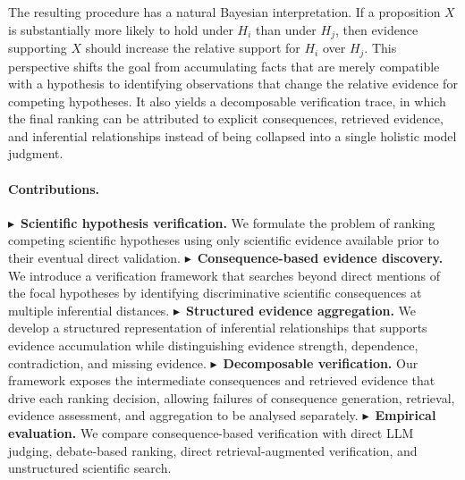\documentclass[twoside]{article}
\begin{document}
The resulting procedure has a natural Bayesian interpretation. If a
proposition $X$ is substantially more likely to hold under $H_i$ than under
$H_j$, then evidence supporting $X$ should increase the relative support for
$H_i$ over $H_j$. This perspective shifts the goal from accumulating facts that are merely
compatible with a hypothesis to identifying observations that change the
relative evidence for competing hypotheses. It also yields a decomposable
verification trace, in which the final ranking can be attributed to explicit
consequences, retrieved evidence, and inferential relationships instead of
being collapsed into a single holistic model judgment.

\paragraph{Contributions.}
$\blacktriangleright$~\textbf{Scientific hypothesis verification.}
We formulate the problem of ranking competing scientific hypotheses using only
scientific evidence available prior to their eventual direct validation.
$\blacktriangleright$~\textbf{Consequence-based evidence discovery.}
We introduce a verification framework that searches beyond direct mentions of
the focal hypotheses by identifying discriminative scientific consequences at
multiple inferential distances.
$\blacktriangleright$~\textbf{Structured evidence aggregation.}
We develop a structured representation of inferential relationships that
supports evidence accumulation while distinguishing evidence strength,
dependence, contradiction, and missing evidence.
$\blacktriangleright$~\textbf{Decomposable verification.}
Our framework exposes the intermediate consequences and retrieved evidence that
drive each ranking decision, allowing failures of consequence generation,
retrieval, evidence assessment, and aggregation to be analysed separately.
$\blacktriangleright$~\textbf{Empirical evaluation.}
We compare consequence-based verification with direct LLM judging,
debate-based ranking, direct retrieval-augmented verification, and unstructured
scientific search.
\end{document}
